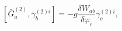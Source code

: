 \begin{equation}
\left[ \bar{G}_{a}^{(2)},\bar{\gamma}_{b}^{(2)i}\right] =-g\frac{\delta
W_{ab}}{\delta \varphi _{c}}\bar{\gamma}_{c}^{(2)i},  \label{i11}
\end{equation}

